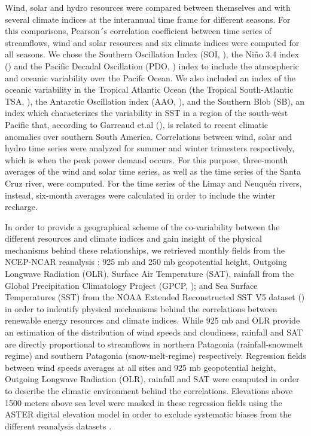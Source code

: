 \documentclass[AMA,Times1COL]{WileyNJDv5} %
\begin{document}
\begin{linenumbers}
Wind, solar and hydro resources were compared between themselves and with several climate indices at the interannual time frame for different seasons. For this comparisons, Pearson´s correlation coefficient between time series of streamflows, wind and solar resources and six climate indices were computed for all seasons. We chose the Southern Oscillation Index (SOI, \cite{ropelewski1987extension}), the Niño 3.4 index (\cite{rayner2003global}) and the Pacific Decadal Oscillation (PDO, \cite{mantua1997pacific}) index to include the atmospheric and oceanic variability over the Pacifc Ocean.  We also included an index of the oceanic variability in the Tropical Atlantic Ocean (the Tropical South-Atlantic TSA, \cite{enfield1999ubiquitous}), the Antarctic Oscillation index (AAO, \cite{mo2000relationships}), and the Southern Blob (SB), an index which characterizes the variability in SST in a region of the south-west Pacific that, according to Garreaud et.al (\cite{garreaud2021south}), is related to recent climatic anomalies over southern South America. Correlations between wind, solar and hydro time series were analyzed for summer and winter trimesters respectively, which is when the peak power demand occurs. For this purpose, three-month averages of the wind and solar time series, as well as the time series of the Santa Cruz river, were computed. For the time series of the Limay and Neuquén rivers, instead, six-month averages were calculated in order to include the winter recharge.

In order to provide a geographical scheme of the co-variability between the different resources and climate indices and gain insight of the physical mechanisms behind these relationships, we retrieved monthly fields from the NCEP-NCAR reanalysis \cite{kalnay2018ncep}: 925 mb and 250 mb geopotential height, Outgoing Longwave Radiation (OLR), Surface Air Temperature (SAT), rainfall from the Global Precipitation Climatology Project (GPCP, \cite{adler2003version}); and Sea Surface Temperatures (SST) from the NOAA Extended Reconstructed SST V5 dataset (\cite{huang2017noaa}) in order to indentify physical mechanisms behind the correlations between renewable energy resources and climate indices. While 925 mb and OLR provide an estimation of the distribution of wind speeds and cloudiness, rainfall and SAT are directly proportional to streamflows in northern Patagonia (rainfall-snowmelt regime) and southern Patagonia (snow-melt-regime) respectively. Regression fields between wind speeds averages at all sites and 925 mb geopotential height, Outgoing Longwave Radiation (OLR), rainfall and SAT were computed in order to describe the climatic environment behind the correlations. Elevations above 1500 meters above sea level were masked in these regression fields using the ASTER digital elevation model \cite{abrams2010aster} in order to exclude systematic biases from the different reanalysis datasets \cite{gao2012elevation, birkel2022evaluation}.


\end{linenumbers}
\end{document}
